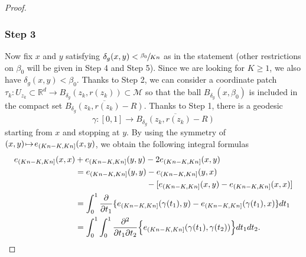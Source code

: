 \documentclass[10pt]{amsart}
\def\mto{\mathchoice{\longmapsto}{\mapsto}{\mapsto}{\mapsto}}
\theoremstyle{theorem}
\theoremstyle{definition}
\newcommand\R{\mathbb{R}}
\begin{document}
\begin{proof}
\subsubsection*{Step 3} Now fix $x$ and $y$ satisfying $\delta_g(x,y)< \sfrac{\beta_0}{Kn}$ as in the statement (other restrictions on $\beta_0$ will be given in Step 4 and Step 5).
Since we are looking for $K\geq 1$, we also have $\delta_g(x,y)<\beta_0$.
Thanks to Step 2, we can consider a coordinate patch $\tau_{k}:U_{z_k}\subset \R^d\to B_{\delta_g}(z_k,r(z_k))\subset \mathcal{M}$ so that the ball $B_{\delta_g}(x,\beta_0)$ is included in the compact set
$\overline{B_{\delta_g}(z_k,r(z_k)-R)}$.
Thanks to Step 1, there is a geodesic
\[
\gamma:[0,1]\to \overline{B_{\delta_g}(z_k,r(z_k)-R)}
\]
starting from $x$ and stopping at $y$.
By using the symmetry of $(x,y)\!\mto\! e_{(Kn-K,Kn]}(x,y)$, we obtain the following integral formulas
\begin{equation}\label{doubl}
\begin{aligned}
e_{(Kn-K,Kn]}(x,x)&+e_{(Kn-K,Kn]}(y,y)-2e_{(Kn-K,Kn]}(x,y) \\
& = e_{(Kn-K,Kn]}(y,y)-e_{(Kn-K,Kn]}(y,x)\\
&\hspace*{3.03cm}
-[e_{(Kn-K,Kn]}(x,y)-e_{(Kn-K,Kn]}(x,x)] \\
& = \int_{0}^1 \frac{\partial }{\partial t_1}\{ e_{(Kn-K,Kn]} (\gamma(t_1),y)-e_{(Kn-K,Kn]} (\gamma(t_1),x)\} dt_1 \\ 
& = \int_{0}^1 \int_{0}^1 \frac{\partial^2 }{\partial t_1 \partial t_2}\Bigl\{ e_{(Kn-K,Kn]}(\gamma(t_1),\gamma(t_2))\Bigr\} dt_1 dt_2.
\end{aligned}
\end{equation}


\end{proof}
\end{document}

